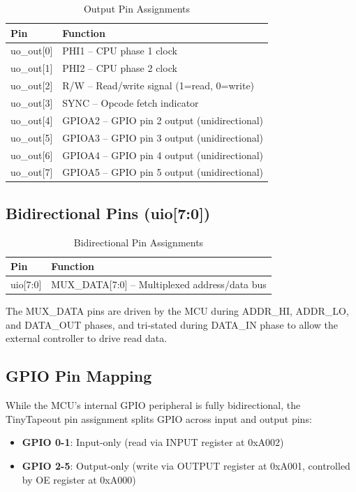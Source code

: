 \documentclass[11pt,a4paper]{article}
\begin{document}
\begin{table}[H]
\centering
\begin{tabular}{ll}
\toprule
\textbf{Pin} & \textbf{Function} \\
\midrule
uo\_out[0] & PHI1 -- CPU phase 1 clock \\
uo\_out[1] & PHI2 -- CPU phase 2 clock \\
uo\_out[2] & R/W -- Read/write signal (1=read, 0=write) \\
uo\_out[3] & SYNC -- Opcode fetch indicator \\
uo\_out[4] & GPIOA2 -- GPIO pin 2 output (unidirectional) \\
uo\_out[5] & GPIOA3 -- GPIO pin 3 output (unidirectional) \\
uo\_out[6] & GPIOA4 -- GPIO pin 4 output (unidirectional) \\
uo\_out[7] & GPIOA5 -- GPIO pin 5 output (unidirectional) \\
\bottomrule
\end{tabular}
\caption{Output Pin Assignments}
\end{table}

\subsection{Bidirectional Pins (uio[7:0])}

\begin{table}[H]
\centering
\begin{tabular}{ll}
\toprule
\textbf{Pin} & \textbf{Function} \\
\midrule
uio[7:0] & MUX\_DATA[7:0] -- Multiplexed address/data bus \\
\bottomrule
\end{tabular}
\caption{Bidirectional Pin Assignments}
\end{table}

The MUX\_DATA pins are driven by the MCU during ADDR\_HI, ADDR\_LO, and DATA\_OUT phases, and tri-stated during DATA\_IN phase to allow the external controller to drive read data.

\subsection{GPIO Pin Mapping}

While the MCU's internal GPIO peripheral is fully bidirectional, the TinyTapeout pin assignment splits GPIO across input and output pins:

\begin{itemize}
    \item \textbf{GPIO 0-1}: Input-only (read via INPUT register at 0xA002)
    \item \textbf{GPIO 2-5}: Output-only (write via OUTPUT register at 0xA001, controlled by OE register at 0xA000)
\end{itemize}
\end{document}
